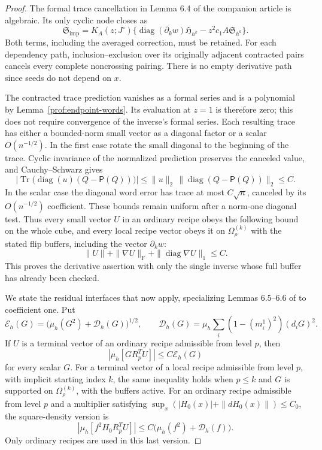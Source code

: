 \begin{proof}
The formal trace cancellation in Lemma 6.4 of the companion article
is algebraic.  Its only cyclic node closes as
\[
 \mathfrak S_{\mathrm{imp}}
 =K_A(z;J^\circ)
       \{\operatorname{diag}(\partial_k w)\mathfrak H_{h^k}
                        -z^2c_1A\mathfrak S_{h^k}\}.
\]
Both terms, including the averaged correction, must be retained.
For each dependency path, inclusion--exclusion over its originally
adjacent contracted pairs cancels every complete noncrossing pairing.
There is no empty derivative path since seeds do not depend on $x$.

The contracted trace prediction vanishes as a formal series and
is a polynomial by Lemma~\ref{prof:endpoint-words}. Its evaluation
at \(z=1\) is therefore zero; this does not require convergence
of the inverse's formal series. Each resulting trace has either a bounded-norm small
vector as a diagonal factor or a scalar $O(n^{-1/2})$.
In the first case rotate the small diagonal to the beginning of
the trace. Cyclic invariance of the normalized prediction preserves
the canceled value, and Cauchy--Schwarz gives
\[
 \left|\operatorname{Tr}\bigl(\operatorname{diag}(u)
                    (Q-\mathsf P(Q))\bigr)\right|
 \le \|u\|_2\,
       \|\operatorname{diag}(Q-\mathsf P(Q))\|_2\le C.
\]
In the scalar case the diagonal word error has trace at most
\(C\sqrt n\), canceled by its \(O(n^{-1/2})\) coefficient.
These bounds remain uniform after a norm-one diagonal test.
Thus every small vector \(U\) in an ordinary recipe obeys the
following bound on the whole cube, and every local recipe vector
obeys it on \(\Omega_\rho^{(k)}\) with the stated flip buffers,
including the vector \(\partial_k w\):
\[
 \|U\|+\|\nabla U\|_{\mathrm F}
           +\|\operatorname{diag}\nabla U\|_1\le C.
\]
This proves the derivative assertion with only the single inverse
whose full buffer has already been checked.

We state the residual interfaces that now apply, specializing
Lemmas 6.5--6.6 of \cite{AcceptedGap} to coefficient one. Put
\[
 \mathcal E_h(G)=
       \bigl(\mu_h(G^2)+\mathcal D_h(G)\bigr)^{1/2},
 \qquad
 \mathcal D_h(G)=\mu_h\sum_i(1-(m_i^1)^2)(d_iG)^2.
\]
If \(U\) is a terminal vector of an ordinary recipe admissible
from level \(p\), then
\[
 |\mu_h[G R_p^TU]|\le C\mathcal E_h(G)
\]
for every scalar \(G\). For a terminal vector of a local recipe
admissible from level \(p\), with implicit starting index \(k\),
the same inequality holds when \(p\le k\) and \(G\) is supported
on \(\Omega_\rho^{(k)}\), with the buffers active.
For an ordinary recipe admissible from level \(p\) and a multiplier satisfying
\(\sup_x(|H_0(x)|+\|dH_0(x)\|)\le C_0\), the square-density
version is
\[
 |\mu_h[f^2H_0R_p^TU]|
 \le C\bigl(\mu_h(f^2)+\mathcal D_h(f)\bigr).
\]
Only ordinary recipes are used in this last version.


\end{proof}
